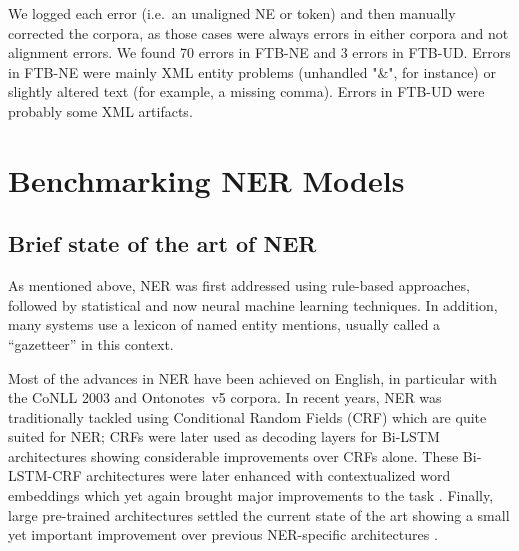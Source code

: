 We logged each error (i.e.~an unaligned NE or token) and then manually corrected the corpora, as those cases were always errors in either corpora and not alignment errors. We found 70 errors in FTB-NE and 3 errors in FTB-UD. Errors in FTB-NE were mainly XML entity problems (unhandled "\&", for instance) or slightly altered text (for example, a missing comma). Errors in FTB-UD were probably some XML artifacts.



\section{Benchmarking NER Models}

\subsection{Brief state of the art of NER}
\label{subsec:sota}

As mentioned above, NER was first addressed using rule-based approaches, followed by statistical and now neural machine learning techniques. In addition, many systems use a lexicon of named entity mentions, usually called a ``gazetteer'' in this context.

Most of the advances in NER  have been achieved on English, in particular with the CoNLL 2003 \cite{tjong-kim-sang-de-meulder-2003-introduction} and  Ontonotes~v5 \cite{pradhan-etal-2012-conll,pradhan-etal-2013-towards} corpora. In recent years, NER was traditionally tackled using Conditional Random Fields (CRF) \cite{lafferty-etal-2001-conditional} which are quite suited for NER; CRFs were later used as decoding layers for Bi-LSTM architectures \cite{huang-etal-2015-bidirectional,lample-etal-2016-neural} showing considerable improvements over CRFs alone. These Bi-LSTM-CRF architectures were later enhanced with contextualized word embeddings which yet again brought major improvements to the task \cite{peters-etal-2018-deep,akbik-etal-2018-contextual}. Finally, large pre-trained architectures settled the current state of the art showing a small yet important improvement over previous NER-specific architectures \cite{devlin-etal-2019-bert,baevski-etal-2019-cloze}.

